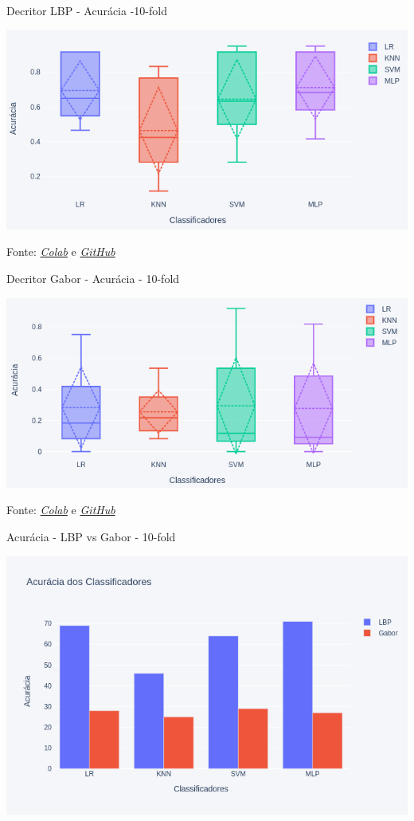 \begin{frame}{Decritor LBP - Acurácia -10-fold}
\begin{center}
	\includegraphics[width=.8\textwidth,height=.7\textheight]{./fig/box_result_lbp.png}
\end{center}
Fonte: \emph{\textcolor{blue}{\href{https://colab.research.google.com/drive/15Ozutw22u9wfAXisgqfhmA33P3s0fbWp?usp=sharing}{Colab}}}
e
\emph{\textcolor{blue}{\href{https://github.com/guimpo/hand_on_again_ai_master/}{GitHub}}}
\end{frame}

\begin{frame}{Decritor Gabor - Acurácia - 10-fold}
\begin{center}
	\includegraphics[width=.8\textwidth,height=.7\textheight]{./fig/box_result_gabor.png}
\end{center}
Fonte: \emph{\textcolor{blue}{\href{https://colab.research.google.com/drive/1U0qTE3tIe4U-ODfb8-bq7YlJft0raeHX?usp=sharing}{Colab}}}
e
\emph{\textcolor{blue}{\href{https://github.com/guimpo/hand_on_again_ai_master/}{GitHub}}}
\end{frame}

\begin{frame}{Acurácia - LBP vs Gabor - 10-fold}
\begin{center}
	\includegraphics[width=.8\textwidth,height=.7\textheight]{./fig/bar_mean_acc_lbp_vs_gabor.png}
\end{center}
\end{frame}



